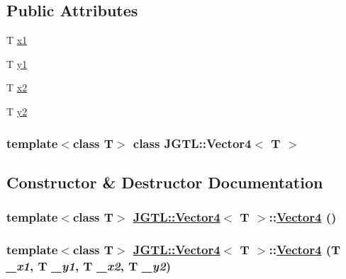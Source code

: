\subsection*{Public Attributes}
\begin{CompactItemize}
\item 
T \hyperlink{class_j_g_t_l_1_1_vector4_b5acf73e4cff45e1aeadf1299ffe7c79}{x1}
\item 
T \hyperlink{class_j_g_t_l_1_1_vector4_250752a0a9e741820f6c2ecfeae4be22}{y1}
\item 
T \hyperlink{class_j_g_t_l_1_1_vector4_aebd3becf0bcf754b0ec7dc2c4c7a1ed}{x2}
\item 
T \hyperlink{class_j_g_t_l_1_1_vector4_5d6fc887b288b2688f7bcb31ee685d25}{y2}
\end{CompactItemize}
\subsubsection*{template$<$class T$>$ class JGTL::Vector4$<$ T $>$}



\subsection{Constructor \& Destructor Documentation}
\hypertarget{class_j_g_t_l_1_1_vector4_310337a8c54f2aa03f2a551b778ddb62}{
\subsubsection[Vector4]{\setlength{\rightskip}{0pt plus 5cm}template$<$class T$>$ \hyperlink{class_j_g_t_l_1_1_vector4}{JGTL::Vector4}$<$ T $>$::\hyperlink{class_j_g_t_l_1_1_vector4}{Vector4} ()}}
\label{class_j_g_t_l_1_1_vector4_310337a8c54f2aa03f2a551b778ddb62}


\hypertarget{class_j_g_t_l_1_1_vector4_98f3b4d9fe3e5b1718e48614d521194e}{
\subsubsection[Vector4]{\setlength{\rightskip}{0pt plus 5cm}template$<$class T$>$ \hyperlink{class_j_g_t_l_1_1_vector4}{JGTL::Vector4}$<$ T $>$::\hyperlink{class_j_g_t_l_1_1_vector4}{Vector4} (T {\em \_\-x1}, T {\em \_\-y1}, T {\em \_\-x2}, T {\em \_\-y2})}}
\label{class_j_g_t_l_1_1_vector4_98f3b4d9fe3e5b1718e48614d521194e}




